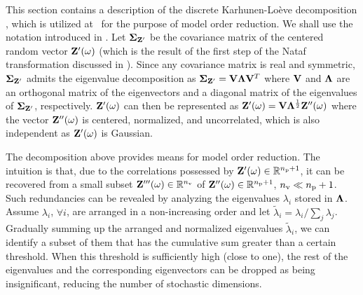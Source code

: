 This section contains a description of the discrete Karhunen-Lo\`{e}ve decomposition \cite{ghanem1991}, which is utilized at \ for the purpose of model order reduction.
We shall use the notation introduced in .
Let $\mCov_{\vZ'}$ be the covariance matrix of the centered random vector $\mathbf{Z}'(\omega)$ (which is the result of the first step of the Nataf transformation discussed in ).
Since any covariance matrix is real and symmetric, $\mCov_{\vZ'}$ admits the eigenvalue decomposition as $\mCov_{\vZ'} = \m{V} \m{\Lambda} \m{V}^T$ where $\m{V}$ and $\m{\Lambda}$ are an orthogonal matrix of the eigenvectors and a diagonal matrix of the eigenvalues of $\mCov_{\vZ'}$, respectively.
$\mathbf{Z}'(\omega)$ can then be represented as $\vZ'(\o) = \m{V} \m{\Lambda}^\frac{1}{2} \vZ''(\o)$ where the vector $\mathbf{Z}''(\omega)$ is centered, normalized, and uncorrelated, which is also independent as $\mathbf{Z}'(\omega)$ is Gaussian.

The decomposition above provides means for model order reduction.
The intuition is that, due to the correlations possessed by $\mathbf{Z}'(\omega) \in \mathbb{R}^{{n_\text{p}} + 1}$, it can be recovered from a small subset $\mathbf{Z}'''(\omega) \in \mathbb{R}^{n_\text{v}}$ of $\mathbf{Z}''(\omega) \in \mathbb{R}^{{n_\text{p}} + 1}$, ${n_\text{v}} \ll {n_\text{p}} + 1$.
Such redundancies can be revealed by analyzing the eigenvalues $\lambda_i$ stored in $\m{\Lambda}$.
Assume $\lambda_i$, $\forall i$, are arranged in a non-increasing order and let $\tilde{\lambda}_i = \lambda_i / \sum_j \lambda_j$.
Gradually summing up the arranged and normalized eigenvalues $\tilde{\lambda}_i$, we can identify a subset of them that has the cumulative sum greater than a certain threshold.
When this threshold is sufficiently high (close to one), the rest of the eigenvalues and the corresponding eigenvectors can be dropped as being insignificant, reducing the number of stochastic dimensions.
